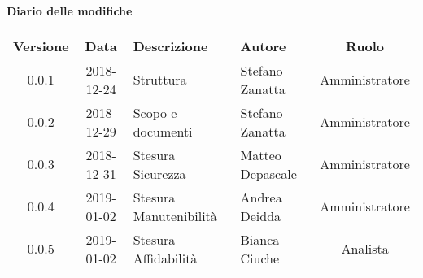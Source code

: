 	\begin{center}
		\textbf{Diario delle modifiche}
	\end{center}
	\begin{center}
		\begin{tabularx}{\textwidth}{|c|c|X|X|c|}
			\hline
			\textbf{Versione} & \textbf{Data} & \textbf{Descrizione} & \textbf{Autore} & \textbf{Ruolo} \\
			\hline
			0.0.1 & 2018-12-24 & Struttura & Stefano Zanatta & Amministratore\\
			0.0.2 & 2018-12-29 & Scopo e documenti & Stefano Zanatta & Amministratore\\
			0.0.3 & 2018-12-31 & Stesura Sicurezza & Matteo Depascale & Amministratore\\
			0.0.4 & 2019-01-02 & Stesura Manutenibilità & Andrea Deidda & Amministratore\\
			0.0.5 & 2019-01-02 & Stesura Affidabilità & Bianca Ciuche & Analista\\
			\hline
		\end{tabularx}
	\end{center}
\newpage